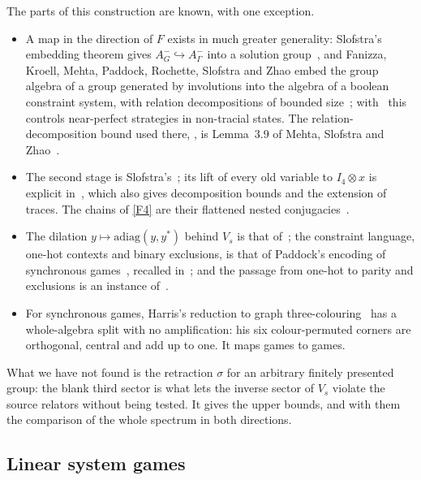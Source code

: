 \begin{remark}\label{rem:universal-sources}
The parts of this construction are known, with one exception.
\begin{itemize}[leftmargin=*,itemsep=1pt]
\item A map in the direction of $F$ exists in much greater generality: Slofstra's embedding theorem gives
$A_G^-\hookrightarrow A_\Gamma^-$ into a solution group~\cite[Theorem~3.1]{Slo20}, and Fanizza, Kroell, Mehta, Paddock, Rochette,
Slofstra and Zhao embed the group algebra of a group generated by involutions into the algebra of a boolean constraint
system, with relation decompositions of bounded size~\cite[Lemma~3.12]{FKMPRSZ25}; with~\cite[Proposition~3.13 and
Lemma~2.9]{FKMPRSZ25} this controls near-perfect strategies in non-tracial states. The relation-decomposition bound used there,
\cite[Lemma~2.9]{FKMPRSZ25}, is Lemma~3.9 of Mehta, Slofstra and Zhao~\cite{MSZ23}.
\item The second stage is Slofstra's~\cite[Lemma~4.4, Proposition~4.2 and Remark~4.5]{Slo19}; its lift of every old variable
to $I_4\otimes x$ is explicit in~\cite[Lemma~5.8 and Theorem~5.5]{FKMPRSZ25}, which also gives decomposition bounds and the
extension of traces. The chains of \ref{F4} are their flattened nested conjugacies~\cite[Definition~5.6 and Lemma~5.7]{FKMPRSZ25}.
\item The dilation $y\mapsto\mathrm{adiag}(y,y^*)$ behind $V_s$ is that of~\cite[Proposition~4.8]{Slo19}; the constraint language,
one-hot contexts and binary exclusions, is that of Paddock's encoding of synchronous games~\cite{Pad22}, recalled
in~\cite[Section~3.2]{PS23}; and the passage from one-hot to parity and exclusions is an instance of~\cite[Lemma~5.4]{PS23}.
\item For synchronous games, Harris's reduction to graph three-colouring~\cite[Lemma~4.4 and Theorems~4.5 and~4.6]{Har23} has a
whole-algebra split with no amplification: his six colour-permuted corners are orthogonal, central and add up to one. It
maps games to games.
\end{itemize}
What we have not found is the retraction $\sigma$ for an arbitrary finitely presented group: the blank third sector is what
lets the inverse sector of $V_s$ violate the source relators without being tested. It gives the upper bounds, and with them
the comparison of the whole spectrum in both directions.
\end{remark}

\subsection{Linear system games}\label{sec:compile-linear}

